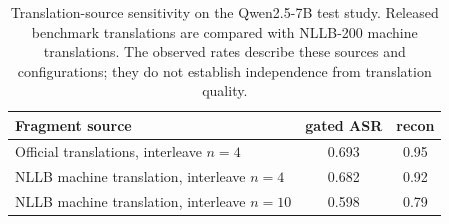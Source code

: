 \begin{table}[t]
\centering
\caption{Translation-source sensitivity on the Qwen2.5-7B test study. Released benchmark translations are compared with NLLB-200 machine translations. The observed rates describe these sources and configurations; they do not establish independence from translation quality.}
\label{tab:mtrobust}
\small
\begin{tabular}{l cc}\toprule
Fragment source & gated ASR & recon \\\midrule
Official translations, interleave $n{=}4$ & 0.693 & 0.95 \\
NLLB machine translation, interleave $n{=}4$ & 0.682 & 0.92 \\
NLLB machine translation, interleave $n{=}10$ & 0.598 & 0.79 \\
\bottomrule\end{tabular}\end{table}